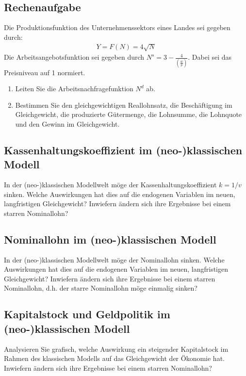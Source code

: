 \documentclass{scrartcl}
\begin{document}
\subsection{Rechenaufgabe}
Die Produktionsfunktion des Unternehmenssektors eines Landes sei gegeben durch:
\begin{align*}
Y = F(N) = 4 \sqrt{N}
\end{align*}
Die Arbeitsangebotsfunktion sei gegeben durch $N^s = 3 -\frac{4}{\left(\frac{w}{p}\right)}$. Dabei sei das Preisniveau auf 1 normiert.
\begin{enumerate}
	\item Leiten Sie die Arbeitsnachfragefunktion $N^d$ ab.
	\item Bestimmen Sie den gleichgewichtigen Reallohnsatz, die Beschäftigung im Gleichgewicht, die produzierte Gütermenge, die Lohnsumme, die Lohnquote und den Gewinn im Gleichgewicht.
\end{enumerate}

\subsection{Kassenhaltungskoeffizient im (neo-)klassischen Modell}
In der (neo-)klassischen Modellwelt möge der Kassenhaltungskoeffizient $k=1/v$ sinken. Welche Auswirkungen hat dies auf die endogenen Variablen im neuen, langfristigen Gleichgewicht? Inwiefern ändern sich ihre Ergebnisse bei einem starren Nominallohn?
\subsection{Nominallohn im (neo-)klassischen Modell}
In der (neo-)klassischen Modellwelt möge der Nominallohn sinken. Welche Auswirkungen hat dies auf die endogenen Variablen im neuen, langfristigen Gleichgewicht? Inwiefern ändern sich ihre Ergebnisse bei einem starren Nominallohn, d.h. der starre Nominallohn möge einmalig sinken?

\subsection{Kapitalstock und Geldpolitik im (neo-)klassischen Modell}
Analysieren Sie grafisch, welche Auswirkung ein steigender Kapitalstock im Rahmen des klassischen Modells auf das Gleichgewicht der Ökonomie hat. Inwiefern ändern sich ihre Ergebnisse bei einem starren Nominallohn?
\end{document}
